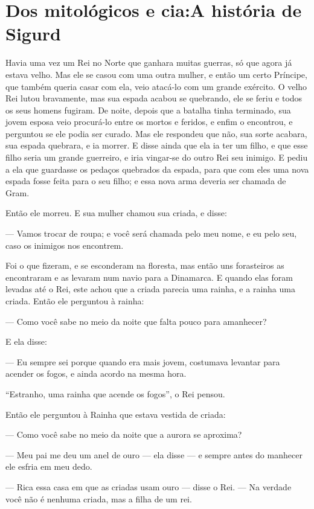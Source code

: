 \chapter{Dos mitológicos e cia:\break A história de Sigurd}

Havia uma vez um Rei no Norte que ganhara muitas guerras, só que agora
já estava velho. Mas ele se casou com uma outra mulher, e então um
certo Príncipe, que também queria casar com ela, veio atacá-lo com um
grande exército. O velho Rei lutou bravamente, mas sua espada acabou
se quebrando, ele se feriu e todos os seus homens fugiram. De noite,
depois que a batalha tinha terminado, sua jovem esposa veio
procurá-lo entre os mortos e feridos, e enfim o encontrou, e
perguntou se ele podia ser curado. Mas ele respondeu que não, sua
sorte acabara, sua espada quebrara, e ia morrer. E disse ainda que
ela ia ter um filho, e que esse filho seria um grande guerreiro, e
iria vingar-se do outro Rei seu inimigo. E pediu a ela que guardasse
os pedaços quebrados da espada, para que com eles uma nova espada
fosse feita para o seu filho; e essa nova arma deveria ser chamada de
Gram. 

Então ele morreu. E sua mulher chamou sua criada, e disse:

— Vamos trocar de roupa; e você será chamada pelo meu nome, e eu pelo
seu, caso os inimigos nos encontrem.

Foi o que fizeram, e se esconderam na floresta, mas então uns
forasteiros as encontraram e as levaram num navio para a Dinamarca. E
quando elas foram levadas até o Rei, este achou que a criada parecia
uma rainha, e a rainha uma criada. Então ele perguntou à rainha:

— Como você sabe no meio da noite que falta pouco para amanhecer? 

E ela disse:

— Eu sempre sei porque quando era mais jovem, costumava levantar para
acender os fogos, e ainda acordo na mesma hora.

“Estranho, uma rainha que acende os fogos”, o Rei pensou.

Então ele perguntou à Rainha que estava vestida de criada:

— Como você sabe no meio da noite que a aurora se aproxima? 

— Meu pai me deu um anel de ouro — ela disse — e sempre antes do
manhecer ele esfria em meu dedo.

— Rica essa casa em que as criadas usam ouro — disse o Rei. — Na
verdade você não é nenhuma criada, mas a filha de um rei. 

